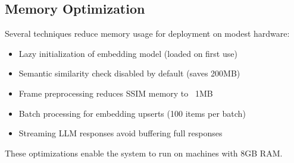 \subsection{Memory Optimization}

Several techniques reduce memory usage for deployment on modest hardware:

\begin{itemize}
    \item Lazy initialization of embedding model (loaded on first use)
    \item Semantic similarity check disabled by default (saves 200MB)
    \item Frame preprocessing reduces SSIM memory to ~1MB
    \item Batch processing for embedding upserts (100 items per batch)
    \item Streaming LLM responses avoid buffering full responses
\end{itemize}

These optimizations enable the system to run on machines with 8GB RAM.



